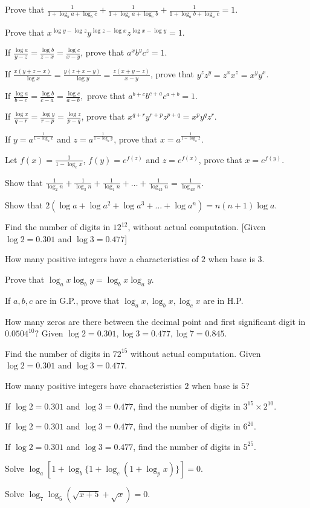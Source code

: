 \item Prove that $\frac{1}{1 + \log_ba + \log_bc} + \frac{1}{1 + \log_ca + \log_cb} + \frac{1}{1 + \log_ab + \log_ac} = 1$.
\item Prove that $x^{\log y - \log z}y^{\log z - \log x}z^{\log x - \log y} = 1$.
\item If $\frac{\log a}{y - z} = \frac{\log b}{z - x} = \frac{\log c}{x - y}$, prove that $a^xb^yc^z = 1$.
\item If $\frac{x(y + z - x)}{\log x} = \frac{y(z + x - y)}{\log y} = \frac{z(x + y - z)}{x - y}$, prove that $y^zz^y = z^xx^z =
  x^yy^x$.
\item If $\frac{\log a}{b - c} = \frac{\log b}{c - a} = \frac{\log c}{a - b},$ prove that $a^{b + c}b^{c + a}c^{a + b} = 1$.
\item If $\frac{\log x}{q - r} = \frac{\log y}{r - p} = \frac{\log z}{p - q}$, prove that $x^{q + r}y^{r + p}z^{p + q} =
  x^py^qz^r$.
\item If $y = a^{\frac{1}{1 - \log _ax}}$ and $z = a^{\frac{1}{1 - \log_ay}}$, prove that $x = a^{\frac{1}{1 - \log_az}}$.
\item Let $f(x) = \frac{1}{1 - \log_ex}$, $f(y) = e^{f(z)}$ and $z = e^{f(x)}$, prove that $x = e^{f(y)}$.
\item Show that $\frac{1}{\log_2n} + \frac{1}{\log_3n} + \frac{1}{\log_4n} + \ldots + \frac{1}{\log_{43}n} =
  \frac{1}{\log_{43!}n}$.
\item Show that $2(\log a + \log a^2 + \log a^3 + \ldots + \log a^n) = n(n + 1)\log a$.
\item Find the number of digits in $12^{12}$, without actual computation. [Given $\log 2 = 0.301$ and $\log 3 = 0.477$]
\item How many positive integers have a characteristics of $2$ when base is $3$.
\item Prove that $\log_ax\log_by = \log_bx\log_ay$.
\item If $a, b, c$ are in G.P., prove that $\log_ax, \log_bx, \log_cx$ are in H.P.
\item How many zeros are there between the decimal point and first significant digit in $0.0504^{10}?$ Given $\log 2 = 0.301, \log
  3 = 0.477, \log 7 = 0.845$.
\item Find the number of digits in $72^{15}$ without actual computation. Given $\log 2 = 0.301$ and $\log  3 = 0.477$.
\item How many positive integers have characteristics $2$ when base is $5$?
\item If $\log 2 = 0.301$ and $\log 3 =0.477$, find the number of digits in $3^{15}\times 2^{10}$.
\item If $\log 2 = 0.301$ and $\log 3 =0.477$, find the number of digits in $6^{20}$.
\item If $\log 2 = 0.301$ and $\log 3 =0.477$, find the number of digits in $5^{25}$.
\item Solve $\log_a[1 + \log_b\{1 + \log_c(1 + \log_px)\}] = 0$.
\item Solve $\log_7\log_5(\sqrt{x + 5} + \sqrt{x}) = 0$.
\stopitemize

